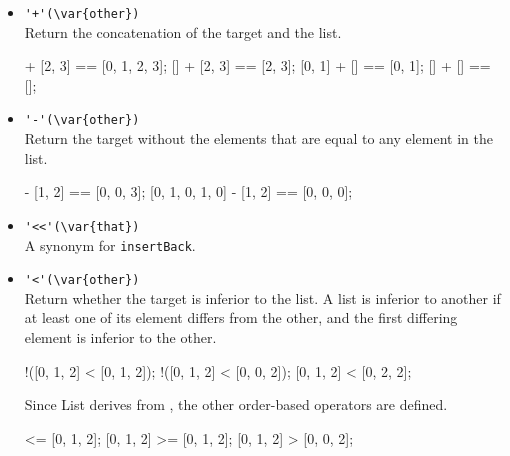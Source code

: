 \begin{itemize}
\begin{urbiscript}
var l = [[]] * 3;
[00000000] [[], [], []]
l[0] << 1;
[00000000] [1]
l;
[00000000] [[1], [1], [1]]
\end{urbiscript}

\item \lstinline|'+'(\var{other})|\\
  Return the concatenation of the target and the  list.

\begin{urbiassert}
[0, 1] + [2, 3] == [0, 1, 2, 3];
[] + [2, 3] == [2, 3];
[0, 1] + [] == [0, 1];
[] + [] == [];
\end{urbiassert}

\item \lstinline|'-'(\var{other})|\\
  Return the target without the elements that are equal to any element
  in the  list.

\begin{urbiassert}
[0, 1, 0, 2, 3] - [1, 2] == [0, 0, 3];
[0, 1, 0, 1, 0] - [1, 2] == [0, 0, 0];
\end{urbiassert}

\item \lstinline|'<<'(\var{that})|\\
  A synonym for \lstinline|insertBack|.

\item \lstinline|'<'(\var{other})|\\
  Return whether the target is inferior to the  list. A
  list is inferior to another if at least one of its element differs
  from the other, and the first differing element is inferior to the
  other.

\begin{urbiassert}
!([0, 1, 2] < [0, 1, 2]);
!([0, 1, 2] < [0, 0, 2]);
[0, 1, 2] < [0, 2, 2];
\end{urbiassert}

  Since List derives from , the other order-based
  operators are defined.

\begin{urbiassert}
 [0, 1, 2] <= [0, 1, 2];
 [0, 1, 2] >= [0, 1, 2];
 [0, 1, 2] >  [0, 0, 2];
\end{urbiassert}
\end{itemize}

